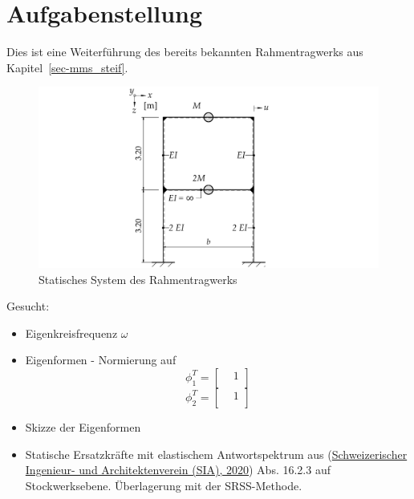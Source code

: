 \documentclass[
  letterpaper,
  DIV=11]{scrreprt}
\begin{document}
\hypertarget{aufgabenstellung-13}{%
\section{Aufgabenstellung}\label{aufgabenstellung-13}}

Dies ist eine Weiterführung des bereits bekannten Rahmentragwerks aus
Kapitel~\ref{sec-mms_steif}.

\begin{figure}[H]

{\centering \includegraphics{index_files/mediabag/bilder/aufgabe_mms_steif_system.pdf}

}

\caption{\label{fig-mms_antwort_system_mms2}Statisches System des
Rahmentragwerks}

\end{figure}

Gesucht:

\begin{itemize}
\item
  Eigenkreisfrequenz \(\omega\)
\item
  Eigenformen - Normierung auf \[\phi_1^T = 
  \begin{bmatrix}
   &  1\\
  \end{bmatrix} \] \[\phi_2^T =
  \begin{bmatrix}
   &  1\\
  \end{bmatrix}\]
\item
  Skizze der Eigenformen
\item
  Statische Ersatzkräfte mit elastischem Antwortspektrum aus
  (\protect\hyperlink{ref-SIA261_2020}{Schweizerischer Ingenieur- und
  Architektenverein (SIA), 2020}) Abs. 16.2.3 auf Stockwerksebene.
  Überlagerung mit der SRSS-Methode.
\end{itemize}
\end{document}
